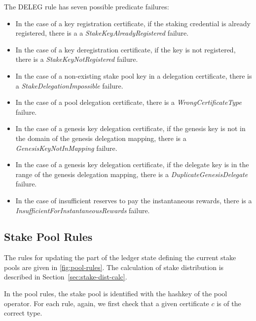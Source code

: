 The DELEG rule has seven possible predicate failures:
\begin{itemize}
\item In the case of a key registration certificate, if the staking credential
  is already registered, there is a a \emph{StakeKeyAlreadyRegistered} failure.
\item In the case of a key deregistration certificate, if the key is not
  registered, there is a \emph{StakeKeyNotRegistered} failure.
\item In the case of a non-existing stake pool key in a delegation certificate,
  there is a \emph{StakeDelegationImpossible} failure.
\item In the case of a pool delegation certificate, there is a
  \emph{WrongCertificateType} failure.
\item  In the case of a genesis key delegation certificate, if the genesis key is not
  in the domain of the genesis delegation mapping, there is a
  \emph{GenesisKeyNotInMapping} failure.
\item  In the case of a genesis key delegation certificate, if the delegate key is
  in the range of the genesis delegation mapping, there is a
  \emph{DuplicateGenesisDelegate} failure.
\item In the case of insufficient reserves to pay the instantaneous rewards,
  there is a \emph{InsufficientForInstantaneousRewards} failure.
\end{itemize}

\clearpage

\subsection{Stake Pool Rules}
\label{sec:pool-rules}


The rules for updating the part of the ledger state defining the current stake
pools are given in \cref{fig:pool-rules}. The calculation of stake distribution
is described in Section~\ref{sec:stake-dist-calc}.

In the pool rules, the stake pool is identified with the hashkey of the pool operator.
For each rule, again, we first check that a given certificate $c$ is of the correct type.

